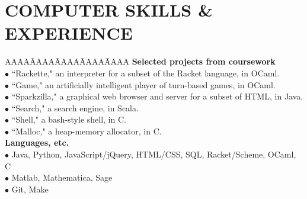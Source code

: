 \documentclass{res}
\begin{document}
\begin{resume}
\begin{tabbing}
   \end{tabbing}
\sectionVspace %
\section{COMPUTER SKILLS \& EXPERIENCE}
\myvspace
\begin{tabbing}
   AAAA\=AAAA\=AAAA\=AAAA\=AAAA\kill
{\bf Selected projects from coursework}\\
	\>$\bullet$ ``Rackette," an interpreter for a subset of the Racket language, in OCaml.\\
	\>$\bullet$ ``Game," an artificially intelligent player of turn-based games, in OCaml.\\
	\>$\bullet$ ``Sparkzilla," a graphical web browser and server for a subset of HTML, in Java.\\
	\>$\bullet$  ``Search," a search engine, in Scala.\\
	\>$\bullet$  ``Shell," a  bash-style shell, in C.\\
	\>$\bullet$  ``Malloc," a heap-memory allocator, in C.\\
\sbreak
{\bf Languages, etc.}\\
  \>$\bullet$ Java, Python, JavaScript/jQuery, HTML/CSS, SQL, Racket/Scheme, OCaml, C\\
  \>$\bullet$ Matlab, Mathematica, Sage\\
  \>$\bullet$ Git, Make\\
\end{tabbing}
\sectionVspace %

\end{resume}
\end{document}
